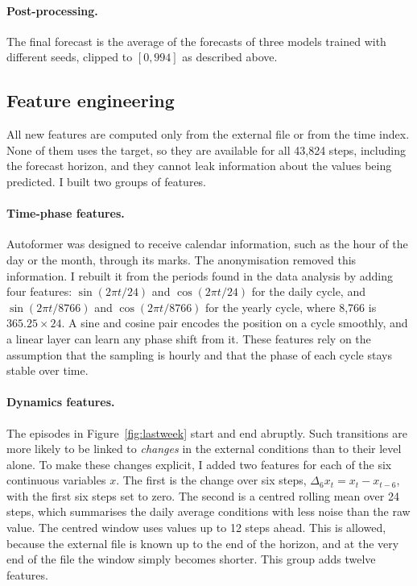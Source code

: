 \documentclass[a4, 12pt]{article}
\begin{document}
\paragraph{Post-processing.} The final forecast is the average of the forecasts of three models trained with different seeds, clipped to $[0, 994]$ as described above.

\subsection{Feature engineering}
\label{sec:features}

All new features are computed only from the external file or from the time index. None of them uses the target, so they are available for all 43,824 steps, including the forecast horizon, and they cannot leak information about the values being predicted. I built two groups of features.

\paragraph{Time-phase features.} Autoformer was designed to receive calendar information, such as the hour of the day or the month, through its marks. The anonymisation removed this information. I rebuilt it from the periods found in the data analysis by adding four features: $\sin(2\pi t/24)$ and $\cos(2\pi t/24)$ for the daily cycle, and $\sin(2\pi t/8766)$ and $\cos(2\pi t/8766)$ for the yearly cycle, where 8,766 is $365.25 \times 24$. A sine and cosine pair encodes the position on a cycle smoothly, and a linear layer can learn any phase shift from it. These features rely on the assumption that the sampling is hourly and that the phase of each cycle stays stable over time.

\paragraph{Dynamics features.} The episodes in Figure~\ref{fig:lastweek} start and end abruptly. Such transitions are more likely to be linked to \emph{changes} in the external conditions than to their level alone. To make these changes explicit, I added two features for each of the six continuous variables $x$. The first is the change over six steps, $\Delta_6 x_t = x_t - x_{t-6}$, with the first six steps set to zero. The second is a centred rolling mean over 24 steps, which summarises the daily average conditions with less noise than the raw value. The centred window uses values up to 12 steps ahead. This is allowed, because the external file is known up to the end of the horizon, and at the very end of the file the window simply becomes shorter. This group adds twelve features.
\end{document}

